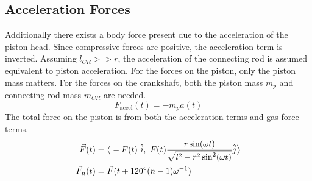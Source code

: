 \documentclass[10pt,a4paper]{article}
\begin{document}
\subsection*{Acceleration Forces}
Additionally there exists a body force present due to the acceleration of the piston head. Since compressive forces are positive, the acceleration term is inverted. Assuming $l_{CR} >> r$, the acceleration of the connecting rod is assumed equivalent to piston acceleration. For the forces on the piston, only the piston mass matters. For the forces on the crankshaft, both the piston mass $m_p$ and connecting rod mass $m_{CR}$ are needed.
$$F_{\text{accel}}(t) = - m_p a(t)$$
The total force on the piston is from both the acceleration terms and gas force terms.
\begin{align}
\vec{F}(t) &= \big \langle -F(t)\ \hat{i},\ F(t) \frac{r \sin(\omega t)}{\sqrt{l^2 - r^2 \sin^2(\omega t)}}  \hat{j} \big \rangle\\
\vec{F}_n(t) &= \vec{F}(t + 120 \degree (n-1)\omega^{-1})
\end{align}
\end{document}

